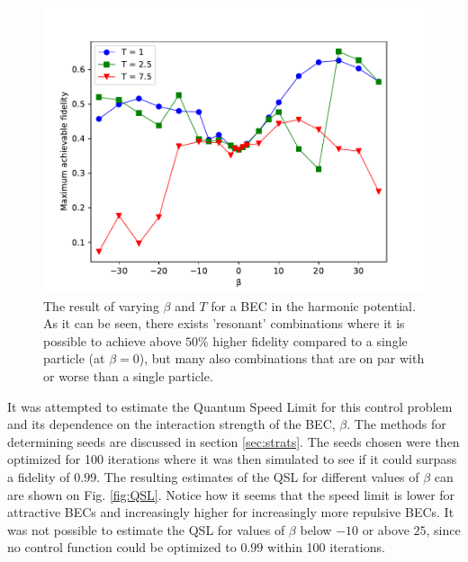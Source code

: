 \documentclass[a4paper, twocolumn]{revtex4-1}
\begin{document}
\begin{figure}[h]
	\includegraphics[width=\columnwidth]{graphics/exploration/betaTHO.pdf}
	\caption{The result of varying $\beta$ and $T$ for a BEC in the harmonic potential. As it can be seen, there exists 'resonant' combinations where it is possible to achieve above $50\%$ higher fidelity compared to a single particle (at $\beta=0$), but many also combinations that are on par with or worse than a single particle.}
	\label{fig:HO}
\end{figure}

It was attempted to estimate the Quantum Speed Limit for this control problem and its dependence on the interaction strength of the BEC, $\beta$. The methods for determining seeds are discussed in section \ref{sec:strats}. The seeds chosen were then optimized for 100 iterations where it was then simulated to see if it could surpass a fidelity of $0.99$.
The resulting estimates of the QSL for different values of $\beta$ can are shown on Fig. \ref{fig:QSL}. Notice how it seems that the speed limit is lower for attractive BECs and increasingly higher for increasingly more repulsive BECs. It was not possible to estimate the QSL for values of $\beta$ below $-10$ or above $25$, since no control function could be optimized to $0.99$ within 100 iterations. \\
\end{document}
